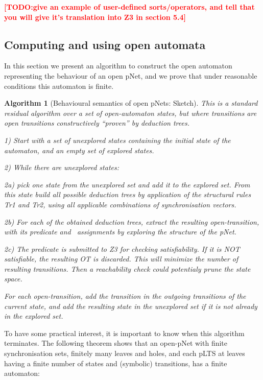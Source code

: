 \documentclass{lncs/llncs}
\newcommand{\TODO}[1]{\textcolor{red}{\textbf{[TODO:#1]}}}
\newcommand{\Post}{\symb{Post}}
\newtheorem{alg}[theorem]{Algorithm}
\begin{document}
\TODO{give an example of user-defined sorts/operators, and tell that
  you will give it's translation into Z3 in section 5.4}

\subsection{Computing and using open automata}
In this section we present an algorithm to construct the open
automaton representing the behaviour of an open pNet, and we prove that
under reasonable conditions this automaton is finite.

\begin{alg}[Behavioural semantics of open pNets: Sketch]
This is a standard residual algorithm over a set of open-automaton
states, but where transitions are open transitions
constructively ``proven'' by deduction trees.

1) Start with a set of unexplored states containing the initial state
of the automaton, and an empty set of explored states.

2) While there are unexplored states:

2a) pick one state from the unexplored set and add it to the explored
set. From this state
build all possible deduction trees by application of the structural
rules Tr1 and Tr2, using all applicable combinations
of synchronisation vectors.

2b) For each of the obtained deduction trees, extract the resulting
open-transition, with its predicate and \Post\ assignments by exploring the structure of 
the pNet.

2c)
The predicate is submitted to Z3 for checking satisfiability. If it is
NOT satisfiable, the resulting OT is discarded. This will minimize the
number of 
resulting transitions. Then a reachability check could potentialy
prune the state space.

For each open-transition,  add the transition in the outgoing transitions of
the current state, and add the
resulting state in the unexplored set if it is not already in the
explored set.

\end{alg}



To have some practical interest, it is important to know when this
algorithm terminates. The following theorem shows that an open-pNet
with finite synchronisation sets, finitely many leaves and
holes, and each pLTS at leaves having a finite number of states and
(symbolic) transitions, has a finite automaton:
\end{document}
